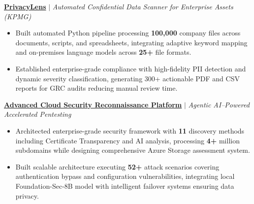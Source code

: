 \documentclass[letterpaper,1pt]{article}
\newcommand{\resumeItem}[1]{
  \item\small{
    #1 \vspace{-2pt}
  }
}
\newcommand{\resumeItemListStart}{\begin{itemize}}
\newcommand{\resumeItemListEnd}{\end{itemize}\vspace{-5pt}}
\begin{document}
\resumeItem{\href{https://github.com/udsy19/PrivacyLens.git}{\textbf{PrivacyLens}} $|$ \textit{Automated Confidential Data Scanner for Enterprise Assets (KPMG)}}
  \resumeItemListStart
    \resumeItem{Built automated Python pipeline processing \textbf{100,000} company files across documents, scripts, and spreadsheets, integrating adaptive keyword mapping and on-premises language models across \textbf{25+} file formats.}
    \resumeItem{Established enterprise-grade compliance with high-fidelity PII detection and dynamic severity classification, generating 300+ actionable PDF and CSV reports for GRC audits reducing manual review time.}
  \resumeItemListEnd

\resumeItem{\href{https://github.com/udsy19/CloudBucket_Pentest.git}{\textbf{Advanced Cloud Security Reconnaissance Platform}} $|$ \textit{Agentic AI–Powered Accelerated Pentesting}}
  \resumeItemListStart
    \resumeItem{Architected enterprise-grade security framework with \textbf{11} discovery methods including Certificate Transparency and AI analysis, processing \textbf{4+} million subdomains while designing comprehensive Azure Storage assessment system.}
    \resumeItem{Built scalable architecture executing \textbf{52+} attack scenarios covering authentication bypass and configuration vulnerabilities, integrating local Foundation-Sec-8B model with intelligent failover systems ensuring data privacy.}
  \resumeItemListEnd




\end{document}
